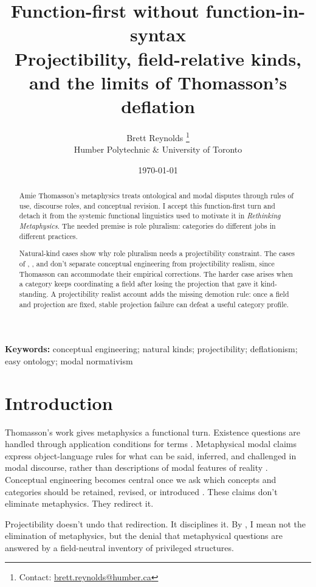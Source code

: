 \documentclass[12pt]{article}
\title{Function-first without function-in-syntax\\
{\large Projectibility, field-relative kinds, and the limits of Thomasson's deflation}}
\author{Brett Reynolds \orcidlink{0000-0003-0073-7195}%
\thanks{Contact: \href{mailto:brett.reynolds@humber.ca}{brett.reynolds@humber.ca}}\\
Humber Polytechnic \& University of Toronto}
\date{\today}
\begin{document}
\maketitle

\begin{abstract}
Amie Thomasson's metaphysics treats ontological and modal disputes through rules of use, discourse roles, and conceptual revision. I accept this function-first turn and detach it from the systemic functional linguistics used to motivate it in \emph{Rethinking Metaphysics}. The needed premise is role pluralism: categories do different jobs in different practices.

Natural-kind cases show why role pluralism needs a projectibility constraint. The cases of , , and  don't separate conceptual engineering from projectibility realism, since Thomasson can accommodate their empirical corrections. The harder case arises when a category keeps coordinating a field after losing the projection that gave it kind-standing. A projectibility realist account adds the missing demotion rule: once a field and projection are fixed, stable projection failure can defeat a useful category profile.
\end{abstract}

\noindent\textbf{Keywords:} conceptual engineering; natural kinds; projectibility; deflationism; easy ontology; modal normativism

\section{Introduction}

Thomasson's work gives metaphysics a functional turn. Existence questions are handled through application conditions for terms \citep{thomasson2014ontology}. Metaphysical modal claims express object-language rules for what can be said, inferred, and challenged in modal discourse, rather than descriptions of modal features of reality \citep{thomasson2020norms}. Conceptual engineering becomes central once we ask which concepts and categories should be retained, revised, or introduced \citep{thomasson2025rethink}. These claims don't eliminate metaphysics. They redirect it.

Projectibility doesn't undo that redirection. It disciplines it. By , I mean not the elimination of metaphysics, but the denial that metaphysical questions are answered by a field-neutral inventory of privileged structures.
\end{document}
